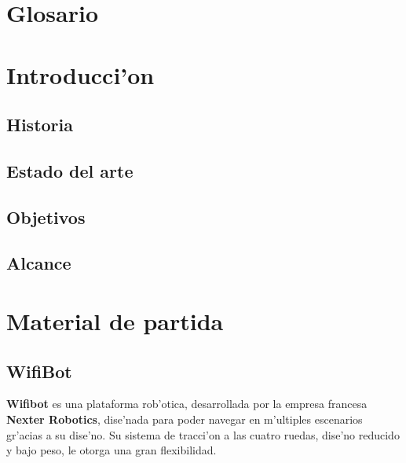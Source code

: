 \documentclass[twoside]{article}
\begin{document}
\paragraph*{}
\thispagestyle{empty}
\newpage


\tableofcontents
\setcounter{page}{1}
\newpage

\setcounter{page}{4}
\fancyhead[LE,RO]{\thepage}

\section{Glosario}
\newpage


\section{Introducci'on}
\subsection{Historia}
\subsection{Estado del arte}
\subsection{Objetivos}
\subsection{Alcance}


\newpage
\section{Material de partida }

\subsection{WifiBot}
\textbf{Wifibot} es una plataforma rob'otica, desarrollada por la empresa francesa \textbf{Nexter Robotics}, dise'nada para poder navegar en m'ultiples escenarios gr'acias a su dise'no. Su sistema de tracci'on a las cuatro ruedas, dise'no reducido y bajo peso, le otorga una gran flexibilidad.
\end{document}
